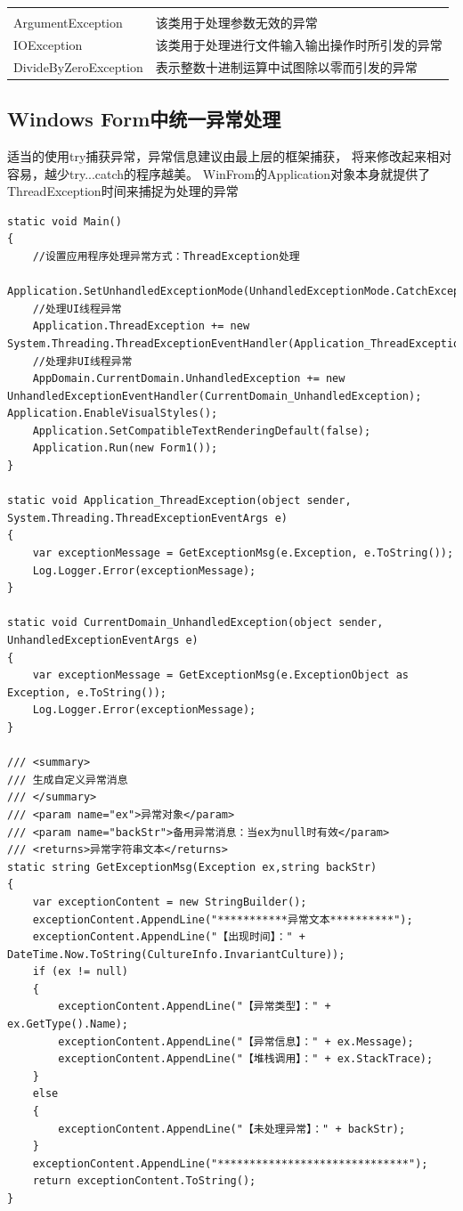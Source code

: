 \documentclass{book}
\begin{document}
\begin{tabular}{ll}
	\multirow{1}{*}{}			
	& \multicolumn{1}{c}{}\\
	ArgumentException & 该类用于处理参数无效的异常\\
	IOException & 该类用于处理进行文件输入输出操作时所引发的异常\\	
	DivideByZeroException & 表示整数十进制运算中试图除以零而引发的异常\\					
\end{tabular}

\subsection{Windows Form中统一异常处理}

适当的使用try捕获异常，异常信息建议由最上层的框架捕获，
将来修改起来相对容易，越少try...catch的程序越美。
WinFrom的Application对象本身就提供了ThreadException时间来捕捉为处理的异常

\begin{lstlisting}[language={[Sharp]C}]
static void Main()
{
    //设置应用程序处理异常方式：ThreadException处理
    Application.SetUnhandledExceptionMode(UnhandledExceptionMode.CatchException);
    //处理UI线程异常
    Application.ThreadException += new System.Threading.ThreadExceptionEventHandler(Application_ThreadException);
    //处理非UI线程异常
    AppDomain.CurrentDomain.UnhandledException += new UnhandledExceptionEventHandler(CurrentDomain_UnhandledException);    Application.EnableVisualStyles();
    Application.SetCompatibleTextRenderingDefault(false);
    Application.Run(new Form1());
}

static void Application_ThreadException(object sender, System.Threading.ThreadExceptionEventArgs e)
{
    var exceptionMessage = GetExceptionMsg(e.Exception, e.ToString());
    Log.Logger.Error(exceptionMessage);
}

static void CurrentDomain_UnhandledException(object sender, UnhandledExceptionEventArgs e)
{
    var exceptionMessage = GetExceptionMsg(e.ExceptionObject as Exception, e.ToString());
    Log.Logger.Error(exceptionMessage);
}

/// <summary>
/// 生成自定义异常消息
/// </summary>
/// <param name="ex">异常对象</param>
/// <param name="backStr">备用异常消息：当ex为null时有效</param>
/// <returns>异常字符串文本</returns>
static string GetExceptionMsg(Exception ex,string backStr)
{
    var exceptionContent = new StringBuilder();
    exceptionContent.AppendLine("***********异常文本**********");
    exceptionContent.AppendLine("【出现时间】：" + DateTime.Now.ToString(CultureInfo.InvariantCulture));
    if (ex != null)
    {
	    exceptionContent.AppendLine("【异常类型】：" + ex.GetType().Name);
	    exceptionContent.AppendLine("【异常信息】：" + ex.Message);
	    exceptionContent.AppendLine("【堆栈调用】：" + ex.StackTrace);
    }
    else
    {
	    exceptionContent.AppendLine("【未处理异常】：" + backStr);
    }
    exceptionContent.AppendLine("******************************");
    return exceptionContent.ToString();
}
\end{lstlisting}
\end{document}
